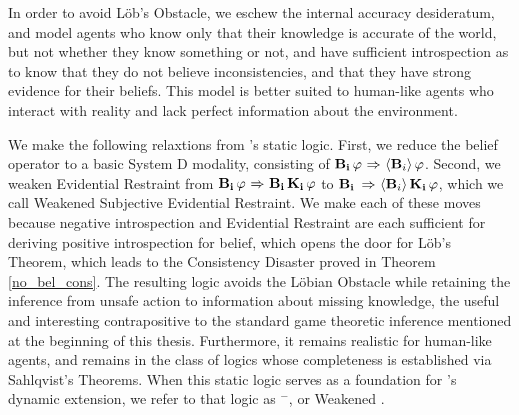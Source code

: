 In order to avoid L\"ob's Obstacle, we eschew the internal accuracy desideratum, and model agents who know only that their knowledge is accurate of the world, but not whether they know something or not, and have sufficient introspection as to know that they do not believe inconsistencies, and that they have strong evidence for their beliefs. This model is better suited to human-like agents who interact with reality and lack perfect information about the environment.

We make the following relaxtions from \DASL's static logic. First, we reduce the belief operator to a basic System D modality, consisting of $\mathbf{B}_{\mathbf{i}}\,\varphi {\ \Rightarrow \ } \langle \mathbf{B}_{i} \rangle\,
\varphi$. Second, we weaken Evidential Restraint from $\mathbf{B}_{\mathbf{i}}\,\varphi {\ \Rightarrow \ } \mathbf{B}_{\mathbf{i}}\,\mathbf{K}_{\mathbf{i}}\,\varphi$ to $\mathbf{B}_{\mathbf{i}}\,{\ \Rightarrow \ } \langle \mathbf{B}_{i} \rangle\,\mathbf{K}_{\mathbf{i}}\,\varphi$, which we call Weakened Subjective Evidential Restraint. We make each of these moves because negative introspection and Evidential Restraint are each sufficient for deriving positive introspection for belief, which opens the door for L\"ob's Theorem, which leads to the Consistency Disaster proved in Theorem \ref{no_bel_cons}. The resulting logic avoids the L\"obian Obstacle while retaining the inference from unsafe action to information about missing knowledge, the useful and interesting contrapositive to the standard game theoretic inference mentioned at the beginning of this thesis. Furthermore, it remains realistic for human-like agents, and remains in the class of logics whose completeness is established via Sahlqvist's Theorems. When this static logic serves as a foundation for \DASL's dynamic extension, we refer to that logic as \DASL$^-$, or Weakened \DASL.

